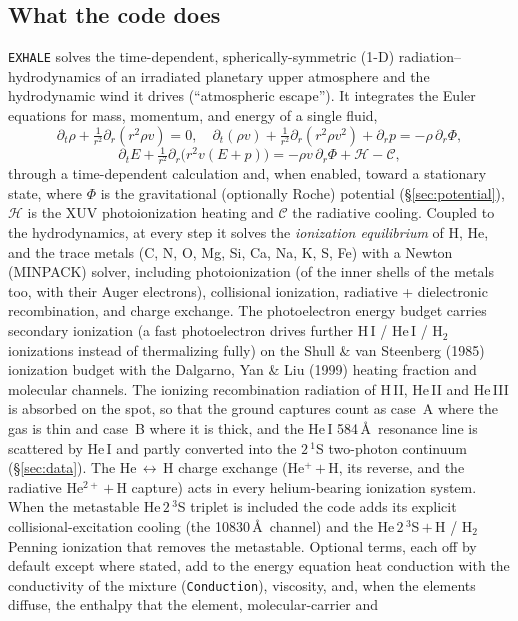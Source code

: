 \documentclass[english,a4paper]{my_memo}
\begin{document}
\subsection{What the code does}
\texttt{EXHALE} solves the time-dependent, spherically-symmetric (1-D)
radiation--hydrodynamics of an irradiated planetary upper atmosphere and the
hydrodynamic wind it drives (``atmospheric escape''). It integrates the Euler
equations for mass, momentum, and energy of a single fluid,
\[
\partial_t \rho + \tfrac{1}{r^2}\partial_r(r^2\rho v)=0,\quad
\partial_t(\rho v)+\tfrac{1}{r^2}\partial_r(r^2\rho v^2)+\partial_r p
   = -\rho\,\partial_r\Phi,
\]
\[
\partial_t E + \tfrac{1}{r^2}\partial_r\!\big(r^2 v(E+p)\big)
   = -\rho v\,\partial_r\Phi + \mathcal{H} - \mathcal{C},
\]
through a time-dependent calculation and, when enabled, toward a stationary
state, where $\Phi$ is the gravitational (optionally Roche) potential
(\S\ref{sec:potential}), $\mathcal{H}$ is the XUV photoionization heating and
$\mathcal{C}$ the radiative cooling. Coupled to the hydrodynamics, at every step it solves the
\emph{ionization equilibrium} of H, He, and the trace metals (C, N, O, Mg, Si,
Ca, Na, K, S, Fe) with a Newton (MINPACK) solver, including photoionization
(of the inner shells of the metals too, with their Auger electrons),
collisional ionization, radiative + dielectronic recombination, and charge
exchange. The photoelectron energy budget carries secondary ionization (a fast
photoelectron drives further H\,I / He\,I / H$_2$ ionizations instead of
thermalizing fully) on the Shull \& van Steenberg (1985) ionization budget
with the Dalgarno, Yan \& Liu (1999) heating fraction and molecular channels.
The ionizing recombination radiation of H\,II, He\,II and He\,III is absorbed on
the spot, so that the ground captures count as case~A where the gas is thin
and case~B where it is thick, and the He\,I 584\,\AA\ resonance line is
scattered by He\,I and partly converted into the $2\,^1$S two-photon continuum
(\S\ref{sec:data}). The He\,$\leftrightarrow$\,H charge exchange (He$^+$\,$+$\,H,
its reverse, and the radiative He$^{2+}$\,$+$\,H capture) acts in every
helium-bearing ionization system. When the metastable He\,$2\,^3$S
triplet is included the code adds its explicit collisional-excitation cooling
(the 10830\,\AA\ channel) and the He\,$2\,^3$S\,$+$\,H / H$_2$ Penning
ionization that removes the metastable. Optional terms, each off by default
except where stated, add to the energy equation heat conduction with the
conductivity of the mixture (\texttt{Conduction}), viscosity, and, when the
elements diffuse, the enthalpy that the element, molecular-carrier and
\end{document}
